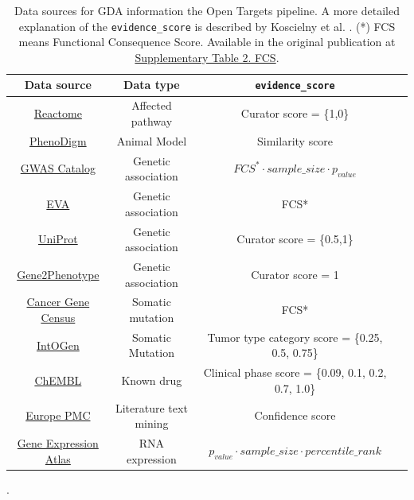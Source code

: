 \begin{table}[H]
\centering
    \begin{tabular}{c|c|c|c}
      Data source & Data type & \texttt{evidence\_score} \\
      \hline
      
      \href{https://goo.gl/sfm7CC}{Reactome} & Affected pathway &
      Curator score = \{1,0\} \\
      
      \href{https://goo.gl/egMxCH}{PhenoDigm} & Animal Model &
      Similarity score \cite{PhenoDigm2013} \\
      
      \href{https://goo.gl/A4UjA5}{GWAS Catalog} & Genetic association &
      $ FCS^* \cdot sample\_size \cdot p_{value} $ \\
      
      \href{https://goo.gl/Vavb1L}{EVA} & Genetic association & 
      FCS* \\
      
      \href{https://goo.gl/5SiDMj}{UniProt} & Genetic association &
      Curator score = \{0.5,1\} \\
      
      \href{https://goo.gl/qwDPhK}{Gene2Phenotype} & Genetic association &
      Curator score = 1 \\
      
      \href{https://goo.gl/dXL3jQ}{Cancer Gene Census} & Somatic mutation &
      FCS* \\
      
      \href{https://goo.gl/kTWn6z}{IntOGen} & Somatic Mutation &
      Tumor type category score = \{0.25, 0.5, 0.75\}\\
      
      \href{https://goo.gl/tJ2wzt}{ChEMBL} & Known drug & Clinical phase score = \{0.09, 0.1, 0.2, 0.7, 1.0\} \\
      
      \href{https://goo.gl/P3UAc9}{Europe PMC} & Literature text mining & Confidence score \cite{kafkas2017} \\
      
      \href{https://goo.gl/1eQbbs}{Gene Expression Atlas} & RNA expression & $p_{value} \cdot sample\_size \cdot percentile\_rank $ \\
      
      \end{tabular}
\caption{Data sources for GDA information the Open Targets pipeline. A more detailed explanation of the \texttt{evidence\_score} is described by Koscielny et al. \cite{koscielny2016}. (*) FCS means Functional Consequence Score. Available in the original publication at \href{https://goo.gl/gkvHxK}{Supplementary Table 2. FCS}.\label{tab:ot_db}}.
\end{table}

